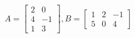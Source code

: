 \documentclass[preview]{standalone}
\begin{document}
\begin{align*}
A = \begin{bmatrix} 2 & 0 \\ 4 & -1 \\ 1 & 3 \end{bmatrix}, B = \begin{bmatrix} 1 & 2 & -1 \\ 5 & 0 & 4 \end{bmatrix}
\end{align*}
\end{document}
